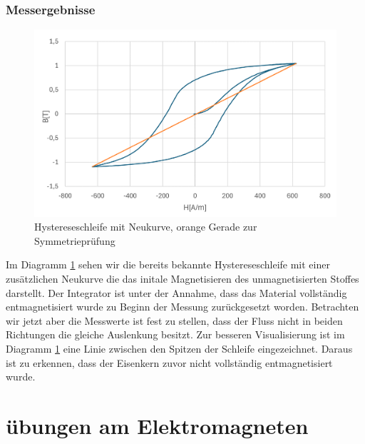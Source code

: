 \documentclass[a4paper,twoside,12pt,DIV=13,BCOR=5mm,numbers=noenddot,cleardoublepage=empty]{scrbook}
\begin{document}
\subsection{Messergebnisse}
\begin{figure}
  \centering
  \includegraphics[width=0.9\linewidth]{pictures/Neukurve.png}
  \caption{Hystereseschleife mit Neukurve, orange Gerade zur Symmetriepr\"ufung}
  \label{fig:neukurve}
\end{figure}
Im Diagramm \ref{fig:neukurve} sehen wir die bereits bekannte Hystereseschleife mit einer zus\"atzlichen Neukurve die das initale Magnetisieren des unmagnetisierten Stoffes darstellt.
 Der Integrator ist unter der Annahme, dass das Material vollst\"andig entmagnetisiert wurde zu Beginn der Messung zur\"uckgesetzt worden. Betrachten wir jetzt aber die Messwerte ist fest zu stellen, dass der Fluss nicht 
 in beiden Richtungen die gleiche Auslenkung besitzt. Zur besseren Visualisierung ist im Diagramm \ref{fig:neukurve} eine Linie zwischen den Spitzen der Schleife eingezeichnet. 
 Daraus ist zu erkennen, dass der Eisenkern zuvor nicht vollst\"andig entmagnetisiert wurde. 


 \chapter{\"ubungen am Elektromagneten}
\end{document}
